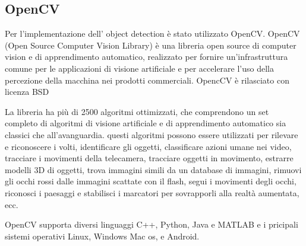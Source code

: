 \subsection{OpenCV}

Per l'implementazione dell' object detection è stato utilizzato OpenCV. OpenCV (Open Source Computer Vision Library) è una libreria open source di computer vision e di apprendimento automatico, realizzato per fornire un'infrastruttura comune per le applicazioni di visione artificiale e per accelerare l'uso della percezione della macchina nei prodotti commerciali. OpencCV è rilasciato con licenza BSD

\noindent La libreria ha più di 2500 algoritmi ottimizzati, che comprendono un set completo di algoritmi di visione artificiale e di apprendimento automatico sia classici che all'avanguardia. questi algoritmi possono essere utilizzati per rilevare e riconoscere i volti, identificare gli oggetti, classificare azioni umane nei video, tracciare i movimenti della telecamera, tracciare oggetti in movimento, estrarre modelli 3D di oggetti, trova immagini simili da un database di immagini, rimuovi gli occhi rossi dalle immagini scattate con il flash, segui i movimenti degli occhi, riconosci i paesaggi e stabilisci i marcatori per sovrapporli alla realtà aumentata, ecc.

\noindent OpenCV supporta diversi linguaggi C++, Python, Java e MATLAB e i pricipali sistemi operativi Linux, Windows Mac os, e Android.

